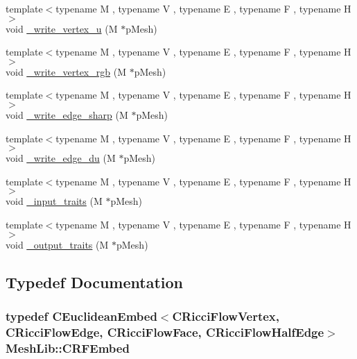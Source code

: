 \begin{DoxyCompactItemize}
\item 
{\footnotesize template$<$typename M , typename V , typename E , typename F , typename H $>$ }\\void \hyperlink{namespace_mesh_lib_ae6730ffd9542087c760392db42735aec}{\+\_\+write\+\_\+vertex\+\_\+u} (M $\ast$p\+Mesh)
\item 
{\footnotesize template$<$typename M , typename V , typename E , typename F , typename H $>$ }\\void \hyperlink{namespace_mesh_lib_a2a9154a87dcd05710107028de17b77fd}{\+\_\+write\+\_\+vertex\+\_\+rgb} (M $\ast$p\+Mesh)
\item 
{\footnotesize template$<$typename M , typename V , typename E , typename F , typename H $>$ }\\void \hyperlink{namespace_mesh_lib_aa18d5be66ec31c430180096e99b2c04c}{\+\_\+write\+\_\+edge\+\_\+sharp} (M $\ast$p\+Mesh)
\item 
{\footnotesize template$<$typename M , typename V , typename E , typename F , typename H $>$ }\\void \hyperlink{namespace_mesh_lib_a0420a9c8c7e4fa00c4e43824dcb9a666}{\+\_\+write\+\_\+edge\+\_\+du} (M $\ast$p\+Mesh)
\item 
{\footnotesize template$<$typename M , typename V , typename E , typename F , typename H $>$ }\\void \hyperlink{namespace_mesh_lib_a1ca033523a32826241d6aa0c028d6f3a}{\+\_\+input\+\_\+traits} (M $\ast$p\+Mesh)
\item 
{\footnotesize template$<$typename M , typename V , typename E , typename F , typename H $>$ }\\void \hyperlink{namespace_mesh_lib_a9a2cf62d8e8109d49ebdb83497cf6f91}{\+\_\+output\+\_\+traits} (M $\ast$p\+Mesh)
\end{DoxyCompactItemize}


\subsection{Typedef Documentation}
\subsubsection[{\texorpdfstring{C\+R\+F\+Embed}{CRFEmbed}}]{\setlength{\rightskip}{0pt plus 5cm}typedef {\bf C\+Euclidean\+Embed}$<${\bf C\+Ricci\+Flow\+Vertex}, C\+Ricci\+Flow\+Edge, C\+Ricci\+Flow\+Face, C\+Ricci\+Flow\+Half\+Edge$>$ {\bf Mesh\+Lib\+::\+C\+R\+F\+Embed}}\hypertarget{namespace_mesh_lib_abdc9df09977d6c620bf5be5a4af503c5}{}\label{namespace_mesh_lib_abdc9df09977d6c620bf5be5a4af503c5}


